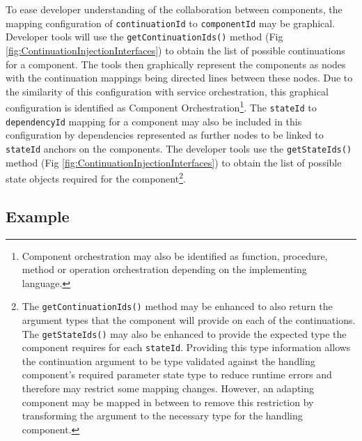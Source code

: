 \documentclass[prodmode]{style/acmlarge}
\begin{document}
To ease developer understanding of the collaboration between components, the
mapping configuration of \texttt{continuationId}  to \texttt{componentId} may be
graphical.  Developer tools will use the \texttt{getContinuationIds()} method
(Fig \ref{fig:ContinuationInjectionInterfaces}) to obtain the list of possible
continuations for a component.  The tools then graphically represent the
components as nodes with the continuation mappings being directed lines between
these nodes.  Due to the similarity of this configuration with service
orchestration, this graphical configuration is identified as Component
Orchestration\footnote{Component orchestration may also be identified as
function, procedure, method or operation orchestration depending on the
implementing language.}.  The \texttt{stateId} to \texttt{dependencyId} mapping
for a component may also be included in this configuration by dependencies
represented as further nodes to be linked to \texttt{stateId} anchors on the
components.  The developer tools use the \texttt{getStateIds()} method (Fig
\ref{fig:ContinuationInjectionInterfaces}) to obtain the list of possible state
objects required for the component\footnote{The \texttt{getContinuationIds()}
method may be enhanced to also return the argument types that the component will
provide on each of the continuations.  The \texttt{getStateIds()} may also be
enhanced to provide the expected type the component requires for each
\texttt{stateId}.  Providing this type information allows the continuation
argument to be type validated against the handling component's required
parameter state type to reduce runtime errors and therefore may restrict some
mapping changes.  However, an adapting component may be mapped in between to
remove this restriction by transforming the argument to the necessary type for
the handling component.}.


\subsection{Example}
\end{document}
